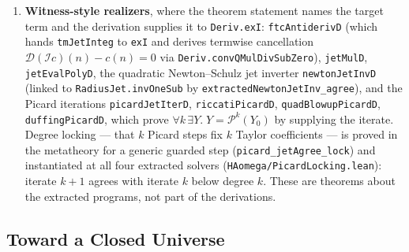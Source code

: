 \documentclass[11pt,a4paper]{article}
\theoremstyle{definition}
\theoremstyle{remark}
\newcommand{\lean}[1]{\texttt{\nolinkurl{#1}}}
\begin{document}
\begin{enumerate}
\begin{itemize}
\item \lean{jetCauchyModulusGenuineD} (\lean{HAomega/JetCauchyDeriv.lean})
writes the Cauchy modulus \(N(k) = k + (B + 3)\) and justifies it from an
\(N\)-free, per-term majorant hypothesis
\(\forall n,\; |S_n(x)-S_{n+1}(x)| < 2^{B+3}(2^{-(n+1)}-2^{-(n+2)})\),
deriving the multi-step tail bound by object-level induction (\lean{Deriv.ind})
on \(d_2\), telescoping cancellation, and precision weakening. Four closed
\(\mathbb{Q}\)-laws (zero bound, triangle inequality, telescoping, scale
cancellation) enter as a hypothesis proved in the metatheory. The majorant
hypothesis is discharged for both \lean{AnalyticJet} and \lean{RadiusJet};
\item \lean{jetContModulusD} and \lean{jetDiffModulusD} write the continuity
modulus \(\omega(k) = k + (B_1 + 1)\) and differentiability modulus
\(\delta(k) = k + (B_2 + 1)\) and certify them via \lean{Deriv.convQLipScale},
discharged for both \lean{AnalyticJet} and \lean{RadiusJet}.
\end{itemize}
\item \textbf{Witness-style realizers}, where the theorem statement names the
target term and the derivation supplies it to \lean{Deriv.exI}:
\lean{ftcAntiderivD} (which hands \lean{tmJetInteg} to \lean{exI} and derives
termwise cancellation \(\mathcal{D}(\mathcal{I}c)(n) - c(n) = 0\) via
\lean{Deriv.convQMulDivSubZero}), \lean{jetMulD}, \lean{jetEvalPolyD}, the
quadratic Newton--Schulz jet inverter \lean{newtonJetInvD} (linked to
\lean{RadiusJet.invOneSub} by \lean{extractedNewtonJetInv_agree}), and the
Picard iterations \lean{picardJetIterD}, \lean{riccatiPicardD},
\lean{quadBlowupPicardD}, \lean{duffingPicardD}, which prove
\(\forall k\,\exists Y.\; Y = \mathcal{P}^k(Y_0)\) by supplying the iterate.
Degree locking --- that \(k\) Picard steps fix \(k\) Taylor coefficients --- is
proved in the metatheory for a generic guarded step
(\lean{picard_jetAgree_lock}) and instantiated at all four extracted solvers
(\lean{HAomega/PicardLocking.lean}): iterate \(k+1\) agrees with iterate \(k\)
below degree \(k\). These are theorems about the extracted programs, not part
of the derivations.
\end{enumerate}

\subsection{Toward a Closed Universe}
\end{document}
